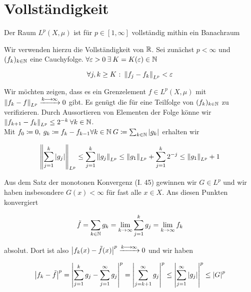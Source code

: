 \documentclass[skript.tex]{subfiles}
\begin{document}
\section{Vollständigkeit}
\begin{theorem}
Der Raum $L^p(X, \mu)$ ist für $p \in [1,\infty]$ vollständig mithin ein Banachraum
\end{theorem}

\begin{bem*}
	Wir verwenden hierzu die Vollständigkeit von $\mathbb{R}$. Sei zunächst $p< \infty$ und $(f_k)_{k \in \mathbb{N}}$ eine Cauchyfolge. $\forall \varepsilon>0 \: \exists \: K=K(\varepsilon) \in \mathbb{N}$
	
	\begin{equation*}
		\forall j,k \geq K \: \colon \left\lVert f_j - f_k \right\rVert_{L^p} < \varepsilon
	\end{equation*}
	
	Wir möchten zeigen, dass es ein Grenzelement $f \in L^p (X, \mu)$ mit $\left\lVert f_k - f \right\rVert_{L^p} \xrightarrow{k\kern -1pt \longrightarrow \kern -1pt\infty} 0$ gibt. Es genügt die für eine Teilfolge von $(f_k)_{k \in \mathbb{N}}$ zu verifizieren. Durch Aussortieren von Elementen der Folge könne wir $ \left\lVert f_{k+1}-f_k \right\rVert_{L^p} \leq 2^{-k} \: \forall k\in\mathbb{N}$. \\
	 Mit $f_0 \coloneqq 0, \: g_k \coloneqq f_k - f_{k-1} \forall k \in \mathbb{N} \: G \coloneqq \sum_{k \in \mathbb{N}} \left| g_k \right|$ erhalten wir
	
	\begin{equation*}
	\left\lVert \sum_{j=1}^{k} \left| g_j \right| \right\rVert_{L^p} \leq \sum_{j=1}^{k} \left\lVert g_j \right\rVert_{L^p} \leq \left\lVert g_1 \right\rVert_{L^p} + \sum_{j=1}^{k} 2^{-j} \leq \left\lVert g_1 \right\rVert_{L^p} +1
	\end{equation*}
	
	Aus dem Satz der monotonen Konvergenz (I. 45) gewinnen wir $G \in L^p$ und wir haben insbesondere $G(x) < \infty$ für fast alle $x \in X$. Ans diesen Punkten konvergiert
	
	\begin{equation*}
	\tilde f = \sum_{k\in \mathbb{N}} g_k = \lim_{ k \to \infty} \sum_{j=1}^{k} g_j = \lim_{k \to \infty} f_k
	\end{equation*}

	absolut. Dort ist also $ \left| f_k(x) - \tilde f(x) \right|^p \xrightarrow{k\kern -1pt \longrightarrow \kern -1pt\infty} 0$ und wir haben
	
	\begin{equation*}
	\left| f_k - \tilde f \right|^p = \left|  \sum_{j=1}^{k} g_j - \sum_{j=1}^{\infty} g_j \right|^p = \left| \sum_{j=k+1}^{\infty} g_j \right|^p \leq \left| \sum_{j=1}^{\infty} \left| g_j \right| \right|^p \leq \left| G \right|^p
	\end{equation*}
	

\end{bem*}
\end{document}
